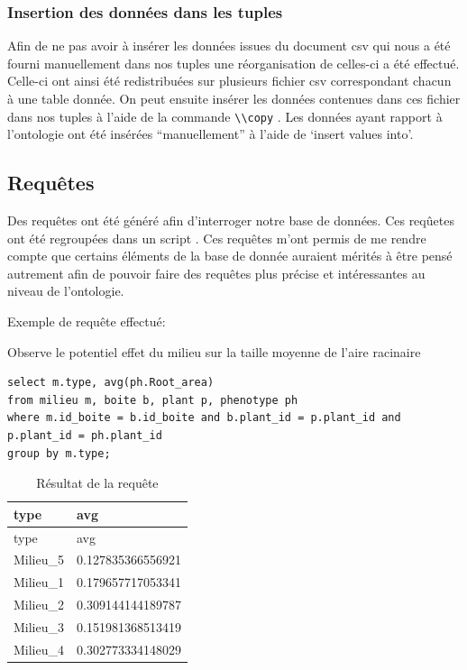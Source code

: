 \documentclass[11pt,french,]{article}
\begin{document}
\hypertarget{insertion-des-donnees-dans-les-tuples}{%
\subsubsection{Insertion des données dans les
tuples}\label{insertion-des-donnees-dans-les-tuples}}

Afin de ne pas avoir à insérer les données issues du document csv qui
nous a été fourni manuellement dans nos tuples une réorganisation de
celles-ci a été effectué. Celle-ci ont ainsi été redistribuées sur
plusieurs fichier csv correspondant chacun à une table donnée. On peut
ensuite insérer les données contenues dans ces fichier dans nos tuples à
l'aide de la commande \texttt{\textbackslash{}\textbackslash{}copy} .
Les données ayant rapport à l'ontologie ont été insérées
``manuellement'' à l'aide de `insert values into'.

\hypertarget{requetes}{%
\subsection{Requêtes}\label{requetes}}

Des requêtes ont été généré afin d'interroger notre base de données. Ces
reqûetes ont été regroupées dans un script . Ces requêtes m'ont permis
de me rendre compte que certains éléments de la base de donnée auraient
mérités à être pensé autrement afin de pouvoir faire des requêtes plus
précise et intéressantes au niveau de l'ontologie.

Exemple de requête effectué:

Observe le potentiel effet du milieu sur la taille moyenne de l'aire
racinaire

\begin{verbatim}
select m.type, avg(ph.Root_area)
from milieu m, boite b, plant p, phenotype ph
where m.id_boite = b.id_boite and b.plant_id = p.plant_id and p.plant_id = ph.plant_id
group by m.type;
\end{verbatim}

\begin{longtable}[]{@{}ll@{}}
\caption{Résultat de la requête}\tabularnewline
\toprule
type & avg\tabularnewline
\midrule
\endfirsthead
\toprule
type & avg\tabularnewline
\midrule
\endhead
Milieu\_5 & 0.127835366556921\tabularnewline
Milieu\_1 & 0.179657717053341\tabularnewline
Milieu\_2 & 0.309144144189787\tabularnewline
Milieu\_3 & 0.151981368513419\tabularnewline
Milieu\_4 & 0.302773334148029\tabularnewline
\bottomrule
\end{longtable}
\end{document}
